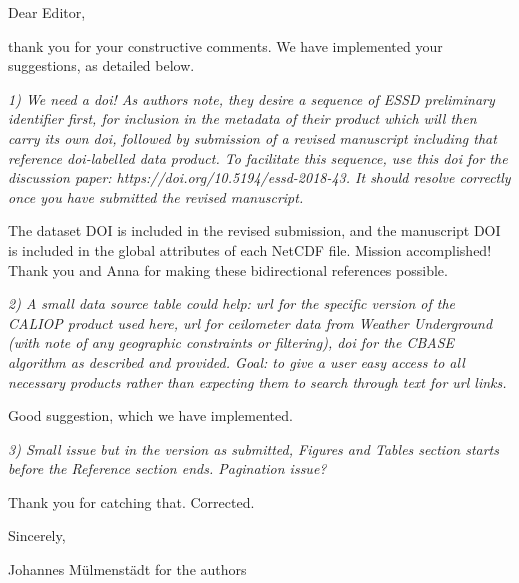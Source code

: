 \documentclass[12pt,a4paper]{responses}
\begin{document}
Dear Editor,

thank you for your constructive comments.  We have implemented your suggestions,
as detailed below.

\textit{1) We need a doi! As authors note, they desire a sequence of ESSD
  preliminary identifier first, for inclusion in the metadata of their product
  which will then carry its own doi, followed by submission of a revised
  manuscript including that reference doi-labelled data product. To facilitate
  this sequence, use this doi for the discussion paper:
  https://doi.org/10.5194/essd-2018-43. It should resolve correctly once you
  have submitted the revised manuscript.}

The dataset DOI is included in the revised submission, and the manuscript DOI is
included in the global attributes of each NetCDF file.  Mission accomplished!
Thank you and Anna for making these bidirectional references possible.

\textit{2) A small data source table could help: url for the specific version of the
CALIOP product used here, url for ceilometer data from Weather Underground (with
note of any geographic constraints or filtering), doi for the CBASE algorithm as
described and provided. Goal: to give a user easy access to all necessary
products rather than expecting them to search through text for url links.}

Good suggestion, which we have implemented.

\textit{3) Small issue but in the version as submitted, Figures and Tables section
starts before the Reference section ends. Pagination issue? }

Thank you for catching that.  Corrected.

Sincerely,

Johannes M\"ulmenst\"adt for the authors
\end{document}
